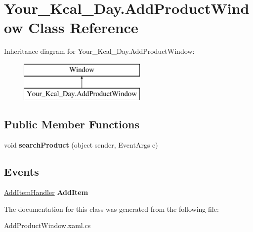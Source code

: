 \hypertarget{class_your___kcal___day_1_1_add_product_window}{}\section{Your\+\_\+\+Kcal\+\_\+\+Day.\+Add\+Product\+Window Class Reference}
\label{class_your___kcal___day_1_1_add_product_window}
Inheritance diagram for Your\+\_\+\+Kcal\+\_\+\+Day.\+Add\+Product\+Window\+:\begin{figure}[H]
\begin{center}
\leavevmode
\includegraphics[height=2.000000cm]{class_your___kcal___day_1_1_add_product_window}
\end{center}
\end{figure}
\subsection*{Public Member Functions}
\begin{DoxyCompactItemize}
\item 
\mbox{\label{class_your___kcal___day_1_1_add_product_window_adbb7be6917b92b762560ae5235723387}} 
void {\bfseries search\+Product} (object sender, Event\+Args e)
\end{DoxyCompactItemize}
\subsection*{Events}
\begin{DoxyCompactItemize}
\item 
\mbox{\label{class_your___kcal___day_1_1_add_product_window_aaa44cff8ae91c7443bf3f11909300928}} 
\mbox{\hyperlink{namespace_your___kcal___day_a544d00dcbc6dc192f292015082379618}{Add\+Item\+Handler}} {\bfseries Add\+Item}
\end{DoxyCompactItemize}


The documentation for this class was generated from the following file\+:\begin{DoxyCompactItemize}
\item 
Add\+Product\+Window.\+xaml.\+cs\end{DoxyCompactItemize}
